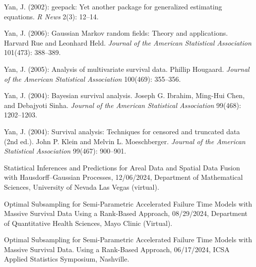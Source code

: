 \documentclass[Statistics]{vita}
\begin{document}
\begin{vita}
\begin{Publications}
\begin{NonRefereedPublications}
  \item Yan, J. (2002): geepack: Yet another package for generalized estimating equations. {\em R News\/} 2(3): 12--14.
  \end{NonRefereedPublications}
  \begin{BookReviews}
  \item Yan, J. (2006): Gaussian Markov random fields: Theory and applications. {H}arvard {R}ue and {L}eonhard {H}eld. {\em Journal of the American Statistical Association\/} 101(473): 388--389.
  \item Yan, J. (2005): Analysis of multivariate survival data. {P}hillip {H}ougaard. {\em Journal of the American Statistical Association\/} 100(469): 355--356.
  \item Yan, J. (2004): Bayesian survival analysis. {J}oseph {G}. {I}brahim, {M}ing-{H}ui {C}hen, and {D}ebajyoti {S}inha. {\em Journal of the American Statistical Association\/} 99(468): 1202--1203.
  \item Yan, J. (2004): Survival analysis: Techniques for censored and truncated data (2nd ed.). {J}ohn {P}. {K}lein and {M}elvin {L}. {M}oeschberger. {\em Journal of the American Statistical Association\/} 99(467): 900--901.
  \end{BookReviews}
  \end{Publications}
  \begin{InvitedTalksLectures}
  \begin{InvitedTalks}
  \item Statistical Inferences and Predictions for Areal Data and Spatial Data Fusion with Hausdorff--Gaussian Processes, 12/06/2024, Department of Mathematical Sciences, University of Nevada Las Vegas (virtual).
  \item Optimal Subsampling for Semi-Parametric Accelerated Failure Time Models with Massive Survival Data Using a Rank-Based Approach, 08/29/2024, Department of Quantitative Health Sciences, Mayo Clinic (Virtual).
  \item Optimal Subsampling for Semi-Parametric Accelerated Failure Time Models with Massive Survival Data. Using a Rank-Based Approach, 06/17/2024, ICSA Applied Statistics Symposium, Nashville.

\end{InvitedTalks}
\end{InvitedTalksLectures}
\end{vita}
\end{document}
